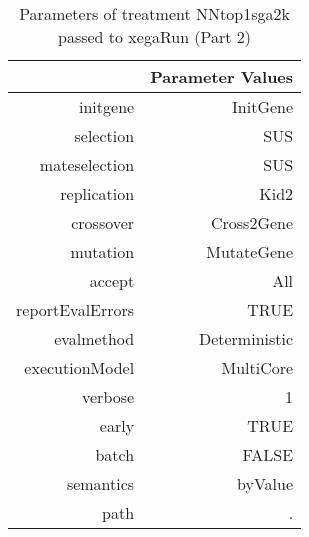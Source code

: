 \begin{table}[ht]
\centering
\begin{tabular}{rr}
  \hline
 & Parameter Values \\ 
  \hline
initgene & InitGene \\ 
  selection & SUS \\ 
  mateselection & SUS \\ 
  replication & Kid2 \\ 
  crossover & Cross2Gene \\ 
  mutation & MutateGene \\ 
  accept & All \\ 
  reportEvalErrors & TRUE \\ 
  evalmethod & Deterministic \\ 
  executionModel & MultiCore \\ 
  verbose & 1 \\ 
  early & TRUE \\ 
  batch & FALSE \\ 
  semantics & byValue \\ 
  path & . \\ 
   \hline
\end{tabular}
\caption{ Parameters of treatment NNtop1sga2k passed to xegaRun
 (Part 2)} 
\end{table}
